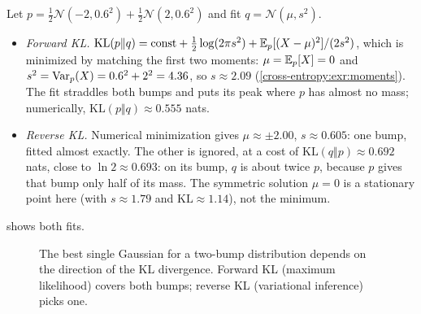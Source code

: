 \begin{notechapter}
\begin{example}\label{cross-entropy:ex:bimodal}
Let $p = \frac12\mathcal N(-2, 0.6^2) + \frac12\mathcal N(2, 0.6^2)$ and fit $q = \mathcal N(\mu, s^2)$.
\begin{itemize}[nosep]
  \item \emph{Forward KL.} $\mathrm{KL}(p\Vert q) = \text{const} + \frac12\log(2\pi s^2) + \mathbb{E}_p[(X - \mu)^2]/(2s^2)$, which is
        minimized by matching the first two moments: $\mu = \mathbb{E}_p[X] = 0$ and
        $s^2 = \operatorname{Var}_p(X) = 0.6^2 + 2^2 = 4.36$, so $s\approx2.09$ (\cref{cross-entropy:exr:moments}). The fit
        straddles both bumps and puts its peak where $p$ has almost no mass;
        numerically, $\mathrm{KL}(p\Vert q)\approx0.555$ nats.
  \item \emph{Reverse KL.} Numerical minimization gives $\mu\approx\pm2.00$, $s\approx0.605$: one bump,
        fitted almost exactly. The other is ignored, at a cost of
        $\mathrm{KL}(q\Vert p)\approx0.692$ nats, close to $\ln2\approx0.693$: on its bump, $q$ is about twice
        $p$, because $p$ gives that bump only half of its mass. The symmetric
        solution $\mu = 0$ is a stationary point here (with $s\approx1.79$ and
        $\mathrm{KL}\approx1.14$), not the minimum.
\end{itemize}
 shows both fits.
\end{example}

\begin{figure}[ht]
\centering
{}
\caption{The best single Gaussian for a two-bump distribution depends on the
direction of the KL divergence. Forward KL (maximum likelihood) covers both bumps;
reverse KL (variational inference) picks one.}
\label{cross-entropy:fig:bimodal}
\end{figure}


\end{notechapter}
